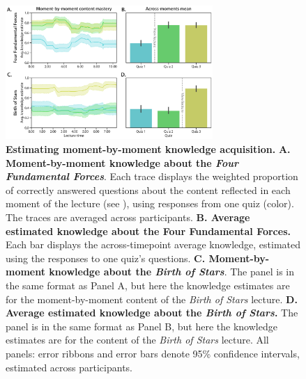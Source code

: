 \documentclass[10pt]{article}
\renewcommand{\nameref}[1]{\mbox{\textit{\oldnameref{#1}}}}
\begin{document}
\begin{figure}[tp]
    \centering
    \includegraphics[width=0.7\textwidth]{figs/content-mastery}

    \caption{\textbf{Estimating moment-by-moment knowledge acquisition.}
    \textbf{A. Moment-by-moment knowledge about the \textit{Four Fundamental
    Forces}}. Each trace displays the weighted proportion of correctly answered
    questions about the content reflected in each moment of the lecture (see
    \nameref{subsec:traces}), using responses from one
    quiz (color). The traces are averaged across participants. \textbf{B.
    Average estimated knowledge about the \textbf{Four Fundamental Forces}.}
    Each bar displays the across-timepoint average knowledge, estimated using
    the responses to one quiz's questions. \textbf{C. Moment-by-moment
    knowledge about the \textit{Birth of Stars}}. The panel is in the same
    format as Panel A, but here the knowledge estimates are for the
    moment-by-moment content of the \textit{Birth of Stars} lecture. \textbf{D.
    Average estimated knowledge about the \textit{Birth of Stars}.} The panel
    is in the same format as Panel B, but here the knowledge estimates are for
    the content of the \textit{Birth of Stars} lecture. All panels: error
    ribbons and error bars denote 95\% confidence intervals, estimated across
    participants.}

    \label{fig:knowledge-timeseries}
\end{figure}
\end{document}
